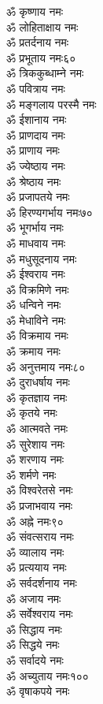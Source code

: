 \begin{center}
\begin{multicols}{2}
\begin{flushleft}
ॐ कृष्णाय नमः\\
ॐ लोहिताक्षाय नमः\\
ॐ प्रतर्दनाय नमः\\
ॐ प्रभूताय नमः\hfill ६०\\
ॐ त्रिककुब्धाम्ने नमः\\
ॐ पवित्राय  नमः\\
ॐ मङ्गलाय परस्मै नमः\\
ॐ ईशानाय नमः\\
ॐ प्राणदाय नमः\\
ॐ प्राणाय नमः\\
ॐ ज्येष्ठाय नमः\\
ॐ श्रेष्ठाय नमः\\
ॐ प्रजापतये नमः\\
ॐ हिरण्यगर्भाय नमः\hfill ७०\\
ॐ भूगर्भाय नमः\\
ॐ माधवाय नमः\\
ॐ मधुसूदनाय नमः\\
ॐ ईश्वराय नमः\\
ॐ विक्रमिणे नमः\\
ॐ धन्विने नमः\\
ॐ मेधाविने नमः\\
ॐ विक्रमाय नमः\\
ॐ क्रमाय नमः\\
ॐ अनुत्तमाय नमः\hfill ८०\\
ॐ दुराधर्षाय नमः\\
ॐ कृतज्ञाय नमः\\
ॐ कृतये नमः\\
ॐ आत्मवते नमः\\
ॐ सुरेशाय नमः\\
ॐ शरणाय नमः\\
ॐ शर्मणे नमः\\
ॐ विश्वरेतसे नमः\\
ॐ प्रजाभवाय नमः\\
ॐ अह्ने नमः\hfill ९०\\
ॐ संवत्सराय नमः\\
ॐ व्यालाय नमः\\
ॐ प्रत्ययाय नमः\\
ॐ सर्वदर्शनाय नमः\\
ॐ अजाय नमः\\
ॐ सर्वेश्वराय नमः\\
ॐ सिद्धाय नमः\\
ॐ सिद्धये नमः\\
ॐ सर्वादये नमः\\
ॐ अच्युताय नमः\hfill १००\\
ॐ वृषाकपये  नमः\\

\end{flushleft}
\end{multicols}
\end{center}

